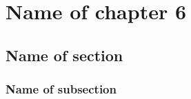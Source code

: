 

\graphicspath{{6/figures/}} %


\chapter{\label{ch6}Name of chapter 6} %

\section{\label{}Name of section}

\subsection{\label{}Name of subsection}




